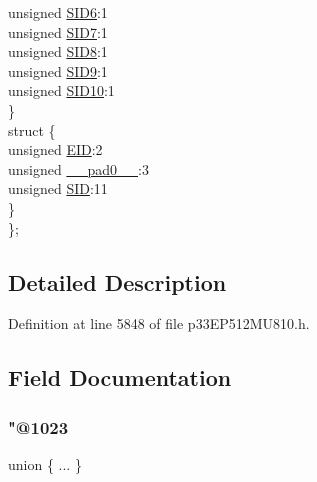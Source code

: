 \begin{DoxyCompactItemize}
\begin{tabbing}
\>\>unsigned \hyperlink{structtag_c2_r_x_m0_s_i_d_b_i_t_s_a70d70952133eb2389d5c326f9f0e8035}{SID6}:1\\
\>\>unsigned \hyperlink{structtag_c2_r_x_m0_s_i_d_b_i_t_s_a34097fb76decd431701fa2d86a22328e}{SID7}:1\\
\>\>unsigned \hyperlink{structtag_c2_r_x_m0_s_i_d_b_i_t_s_afe74894633244fdb0b0c01b4e8c522e7}{SID8}:1\\
\>\>unsigned \hyperlink{structtag_c2_r_x_m0_s_i_d_b_i_t_s_a33587704948067005c2a6a3ccc503c99}{SID9}:1\\
\>\>unsigned \hyperlink{structtag_c2_r_x_m0_s_i_d_b_i_t_s_a1a9084031c7f5fb16007feeebf0d8216}{SID10}:1\\
\>\} \\
\>struct \{\\
\>\>unsigned \hyperlink{structtag_c2_r_x_m0_s_i_d_b_i_t_s_ae80b378c9141f7c03e0b4e55b5f4b54d}{EID}:2\\
\>\>unsigned \hyperlink{structtag_c2_r_x_m0_s_i_d_b_i_t_s_adf71f3d8410c1f1dbbc96680a92c49af}{\_\_pad0\_\_}:3\\
\>\>unsigned \hyperlink{structtag_c2_r_x_m0_s_i_d_b_i_t_s_af88edf93b2fee2432665bd84f51287e4}{SID}:11\\
\>\} \\
\}; \\

\end{tabbing}\end{DoxyCompactItemize}


\subsection{Detailed Description}


Definition at line 5848 of file p33\+E\+P512\+M\+U810.\+h.



\subsection{Field Documentation}
\mbox{\label{structtag_c2_r_x_m0_s_i_d_b_i_t_s_aaef09f85a77b898b083b561082750b2e}} 
\subsubsection{\texorpdfstring{"@1023}{@1023}}
{\footnotesize\ttfamily union \{ ... \} }

\mbox{\label{structtag_c2_r_x_m0_s_i_d_b_i_t_s_adf71f3d8410c1f1dbbc96680a92c49af}} 
